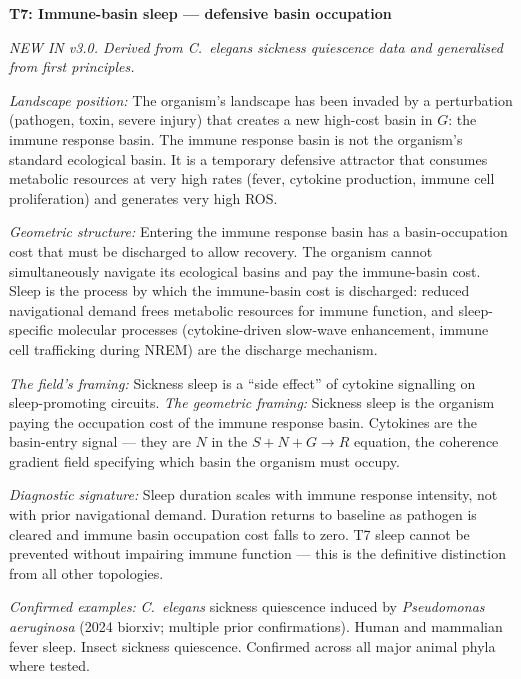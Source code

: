 \documentclass[10pt, a4paper]{article}
\begin{document}
\vspace{0.4em}

\begin{mdframed}[
  backgroundcolor=newbox,
  linecolor=headergreen,
  linewidth=0.8pt,
  innertopmargin=0.6em,
  innerbottommargin=0.6em,
  innerleftmargin=0.8em,
  innerrightmargin=0.8em
]
\textbf{T7: Immune-basin sleep ---
defensive basin occupation}

\textit{NEW IN v3.0. Derived from
\textit{C.~elegans} sickness quiescence
data and generalised from first
principles.}

\textit{Landscape position:} The
organism's landscape has been invaded
by a perturbation (pathogen, toxin,
severe injury) that creates a new
high-cost basin in $G$: the immune
response basin. The immune response
basin is not the organism's standard
ecological basin. It is a temporary
defensive attractor that consumes
metabolic resources at very high rates
(fever, cytokine production, immune cell
proliferation) and generates very high
ROS.

\textit{Geometric structure:} Entering
the immune response basin has a
basin-occupation cost that must be
discharged to allow recovery. The
organism cannot simultaneously navigate
its ecological basins and pay the
immune-basin cost. Sleep is the process
by which the immune-basin cost is
discharged: reduced navigational demand
frees metabolic resources for immune
function, and sleep-specific molecular
processes (cytokine-driven slow-wave
enhancement, immune cell trafficking
during NREM) are the discharge mechanism.

\textit{The field's framing:} Sickness
sleep is a ``side effect'' of cytokine
signalling on sleep-promoting circuits.
\textit{The geometric framing:} Sickness
sleep is the organism paying the
occupation cost of the immune response
basin. Cytokines are the basin-entry
signal --- they are $N$ in the
$S + N + G \rightarrow R$ equation,
the coherence gradient field specifying
which basin the organism must occupy.

\textit{Diagnostic signature:} Sleep
duration scales with immune response
intensity, not with prior navigational
demand. Duration returns to baseline
as pathogen is cleared and immune basin
occupation cost falls to zero. T7 sleep
cannot be prevented without impairing
immune function --- this is the definitive
distinction from all other topologies.

\textit{Confirmed examples:}
\textit{C.~elegans} sickness quiescence
induced by \textit{Pseudomonas
aeruginosa} (2024 biorxiv; multiple
prior confirmations). Human and mammalian
fever sleep. Insect sickness quiescence.
Confirmed across all major animal phyla
where tested.


\end{mdframed}
\end{document}
